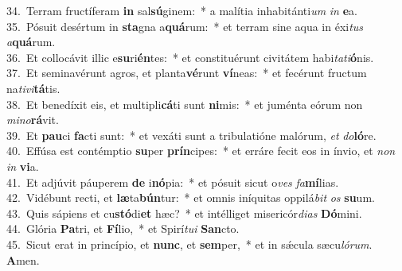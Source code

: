 {34.~}Terram fructíferam \textbf{in} sal\textbf{sú}ginem:~* a malítia inhabitánti\textit{um} \textit{in} \textbf{e}a.\\
{35.~}Pósuit desértum in \textbf{sta}gna a\textbf{quá}rum:~* et terram sine aqua in éxi\textit{tus} \textit{a}\textbf{quá}rum.\\
{36.~}Et collocávit illic e\textbf{su}ri\textbf{én}tes:~* et constituérunt civitátem habi\textit{ta}\textit{ti}\textbf{ó}nis.\\
{37.~}Et seminavérunt agros, et planta\textbf{vé}runt \textbf{ví}neas:~* et fecérunt fructum na\textit{ti}\textit{vi}\textbf{tá}tis.\\
{38.~}Et benedíxit eis, et multipli\textbf{cá}ti sunt \textbf{ni}mis:~* et juménta eórum non \textit{mi}\textit{no}\textbf{rá}vit.\\
{39.~}Et \textbf{pau}ci \textbf{fa}cti sunt:~* et vexáti sunt a tribulatióne malórum, \textit{et} \textit{do}\textbf{ló}re.\\
{40.~}Effúsa est contémptio \textbf{su}per \textbf{prín}cipes:~* et erráre fecit eos in ínvio, et \textit{non} \textit{in} \textbf{vi}a.\\
{41.~}Et adjúvit páuperem \textbf{de} i\textbf{nó}pia:~* et pósuit sicut o\textit{ves} \textit{fa}\textbf{mí}lias.\\
{42.~}Vidébunt recti, et \textbf{læ}ta\textbf{bún}tur:~* et omnis iníquitas oppilá\textit{bit} \textit{os} \textbf{su}um.\\
{43.~}Quis sápiens et cu\textbf{stó}di\textbf{et} hæc?~* et intélliget misericór\textit{di}\textit{as} \textbf{Dó}mini.\\
{44.~}Glória \textbf{Pa}tri, et \textbf{Fí}lio,~* et Spirí\textit{tu}\textit{i} \textbf{San}cto.\\
{45.~}Sicut erat in princípio, et \textbf{nunc}, et \textbf{sem}per,~* et in sǽcula sæcu\textit{ló}\textit{rum}. \textbf{A}men.\\

